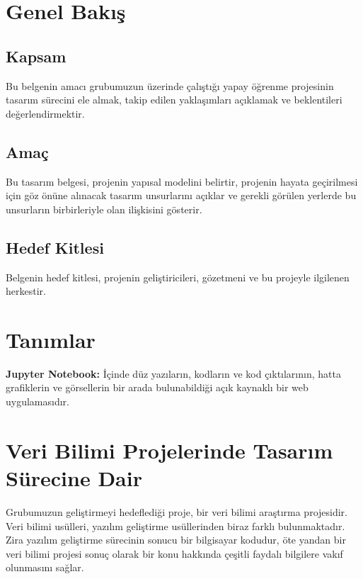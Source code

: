 \documentclass[12pt,a4paper]{article}
\begin{document}
    
    \newpage

    \tableofcontents
    \newpage


    \section{Genel Bakış}
    \subsection{Kapsam}
    Bu belgenin amacı grubumuzun üzerinde çalıştığı yapay öğrenme projesinin tasarım sürecini
    ele almak, takip edilen yaklaşımları açıklamak ve beklentileri değerlendirmektir. 

    \subsection{Amaç}
    Bu tasarım belgesi, projenin yapısal modelini belirtir, projenin hayata
    geçirilmesi için göz önüne alınacak tasarım unsurlarını açıklar ve gerekli
    görülen yerlerde bu unsurların birbirleriyle olan ilişkisini gösterir.

    \subsection{Hedef Kitlesi}
    Belgenin hedef kitlesi, projenin geliştiricileri, gözetmeni ve bu projeyle
    ilgilenen herkestir. 

    \section{Tanımlar}
    \textbf{Jupyter Notebook:} İçinde düz yazıların, kodların ve kod çıktılarının, hatta grafiklerin ve
    görsellerin bir arada bulunabildiği açık kaynaklı bir web uygulamasıdır. \cite{jupy}

    \section{Veri Bilimi Projelerinde Tasarım Sürecine Dair}
    Grubumuzun geliştirmeyi hedeflediği proje, bir veri bilimi araştırma projesidir.
    Veri bilimi usülleri, yazılım geliştirme usüllerinden biraz farklı bulunmaktadır.
    Zira yazılım geliştirme sürecinin sonucu bir bilgisayar kodudur, öte yandan
    bir veri bilimi projesi sonuç olarak bir konu hakkında çeşitli faydalı
    bilgilere vakıf olunmasını sağlar. 
\end{document}
